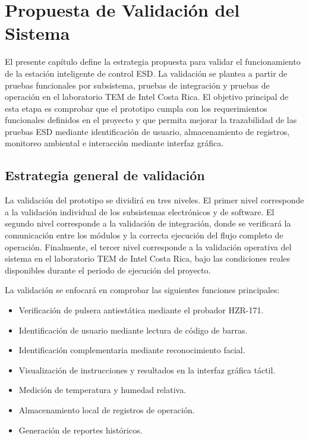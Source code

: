\chapter{Propuesta de Validación del Sistema}

El presente capítulo define la estrategia propuesta para validar el funcionamiento de la
estación inteligente de control ESD. La validación se plantea a partir de pruebas funcionales
por subsistema, pruebas de integración y pruebas de operación en el laboratorio TEM
de Intel Costa Rica. El objetivo principal de esta etapa es comprobar que el prototipo
cumpla con los requerimientos funcionales definidos en el proyecto y que permita mejorar
la trazabilidad de las pruebas ESD mediante identificación de usuario, almacenamiento de
registros, monitoreo ambiental e interacción mediante interfaz gráfica.

\section{Estrategia general de validación}

La validación del prototipo se dividirá en tres niveles. El primer nivel corresponde a la
validación individual de los subsistemas electrónicos y de software. El segundo nivel
corresponde a la validación de integración, donde se verificará la comunicación entre los
módulos y la correcta ejecución del flujo completo de operación. Finalmente, el tercer nivel
corresponde a la validación operativa del sistema en el laboratorio TEM de Intel Costa
Rica, bajo las condiciones reales disponibles durante el periodo de ejecución del proyecto.

La validación se enfocará en comprobar las siguientes funciones principales:

\begin{itemize}
    \item Verificación de pulsera antiestática mediante el probador HZR-171.
    \item Identificación de usuario mediante lectura de código de barras.
    \item Identificación complementaria mediante reconocimiento facial.
    \item Visualización de instrucciones y resultados en la interfaz gráfica táctil.
    \item Medición de temperatura y humedad relativa.
    \item Almacenamiento local de registros de operación.
    \item Generación de reportes históricos.
\end{itemize}

